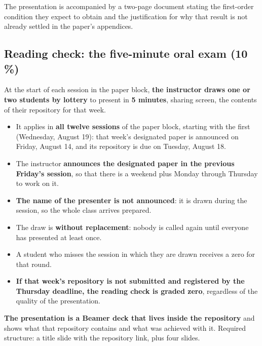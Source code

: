 \documentclass[11pt]{article}
\begin{document}
The presentation is accompanied by a two-page document stating the first-order condition they expect to obtain and the justification for why that result is not already settled in the paper's appendices.

\subsection*{Reading check: the five-minute oral exam (10\,\%)}

At the start of each session in the paper block, \textbf{the instructor draws one or two students by lottery} to present in \textbf{5 minutes}, sharing screen, the contents of their repository for that week.

\begin{itemize}
\item It applies in \textbf{all twelve sessions} of the paper block, starting with the first (Wednesday, August 19): that week's designated paper is announced on Friday, August 14, and its repository is due on Tuesday, August 18.
\item The instructor \textbf{announces the designated paper in the previous Friday's session}, so that there is a weekend plus Monday through Thursday to work on it.
\item \textbf{The name of the presenter is not announced}: it is drawn during the session, so the whole class arrives prepared.
\item The draw is \textbf{without replacement}: nobody is called again until everyone has presented at least once.
\item A student who misses the session in which they are drawn receives a zero for that round.
\item \textbf{If that week's repository is not submitted and registered by the Thursday deadline, the reading check is graded zero}, regardless of the quality of the presentation.
\end{itemize}

\textbf{The presentation is a Beamer deck that lives inside the repository} and shows what that repository contains and what was achieved with it. Required structure: a title slide with the repository link, plus four slides.
\end{document}
